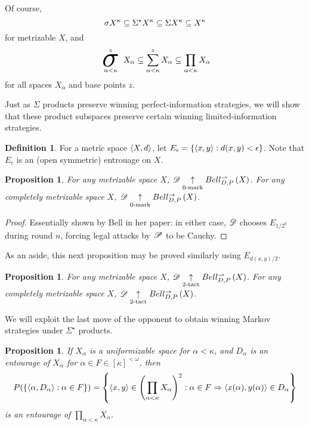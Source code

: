\documentclass{amsart}
\newtheorem{proposition}[theorem]{Proposition}
\theoremstyle{definition}
\newtheorem{definition}[theorem]{Definition}
\begin{document}
  Of course,
    \[
      {\sigma X^\kappa}
        \subseteq
      {\Sigma^\star X^\kappa}
        \subseteq
      {\Sigma X^\kappa}
        \subseteq
      X^\kappa
    \]
  for metrizable \(X\), and
    \[
      \sigmaProd_{\alpha<\kappa}^{z}X_\alpha
        \subseteq
      \SigmaProd_{\alpha<\kappa}^{z}X_\alpha
        \subseteq
      \prod_{\alpha<\kappa}X_\alpha
    \]
  for all spaces \(X_\alpha\) and base points \(z\).

  Just as \(\Sigma\) products preserve winning perfect-information strategies,
  we will show that these product subspaces preserve certain
  winning limited-information strategies.

  \begin{definition}
    For a metric space \(\langle X,d\rangle\), let
    \(E_\epsilon=\{\langle x,y\rangle:d(x,y)<\epsilon\}\). Note that \(E_\epsilon\)
    is an (open symmetric) entrouage on \(X\).
  \end{definition}

  \begin{proposition}
    For any metrizable space \(X\),
    \(\mathscr{D}\underset{0\text{-mark}}{\uparrow}Bell_{D,P}^{\rightharpoonup}\left({X}\right)\).
    For any completely metrizable space \(X\),
    \(\mathscr{D}\underset{0\text{-mark}}{\uparrow}Bell_{D,P}^{\to}\left({X}\right)\).
  \end{proposition}

  \begin{proof}
    Essentially shown by Bell in her paper: in either case,
    \(\mathscr{D}\) chooses \(E_{1/2^{n}}\)
    during round \(n\), forcing legal attacks by \(\mathscr{P}\) to be Cauchy.
  \end{proof}

  As an aside, this next proposition may be proved similarly
  using \(E_{d(x,y)/2}\).

  \begin{proposition}
    For any metrizable space \(X\),
    \(\mathscr{D}\underset{2\text{-tact}}{\uparrow}Bell_{D,P}^{\rightharpoonup}\left({X}\right)\).
    For any completely metrizable space \(X\),
    \(\mathscr{D}\underset{2\text{-tact}}{\uparrow}Bell_{D,P}^{\to}\left({X}\right)\).
  \end{proposition}

  We will exploit the last move of the
  opponent to obtain winning Markov strategies under
  \(\Sigma^\star\) products.

  \begin{proposition}
    If \(X_\alpha\) is a uniformizable space for \(\alpha<\kappa\),
    and \(D_\alpha\) is an entourage of \(X_\alpha\) for
    \(\alpha\in F\in[\kappa]^{<\omega}\), then
      \[
        P(\{\langle\alpha,D_\alpha\rangle:\alpha\in F\})
          =
        \left\{
          \langle x,y\rangle\in\left(\prod_{\alpha<\kappa}X_\alpha\right)^2
        :
          \alpha\in F
        \Rightarrow
          \langle x(\alpha),y(\alpha)\rangle\in D_\alpha
        \right\}
      \]
    is an entourage of \(\prod_{\alpha<\kappa}X_\alpha\).
  \end{proposition}
\end{document}
